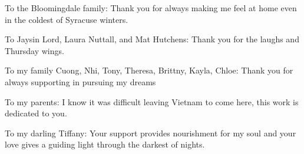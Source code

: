 \documentclass[oneside,12pt]{book}
\begin{document}
To the Bloomingdale family: Thank you for always making me feel at home even in the coldest of Syracuse winters.

To Jaysin Lord, Laura Nuttall, and Mat Hutchens: Thank you for the laughs and Thursday wings.

To my family Cuong, Nhi, Tony, Theresa, Brittny, Kayla, Chloe: Thank you for always supporting in pursuing my dreams

To my parents: I know it was difficult leaving Vietnam to come here, this work is dedicated to you.

To my darling Tiffany: Your support provides nourishment for my soul and your love gives a guiding light through the darkest of nights.


\tableofcontents


%	
%
%

%
%
%
%
%
%

\listoffigures
\listoftables

\medskip





	
\end{document}

